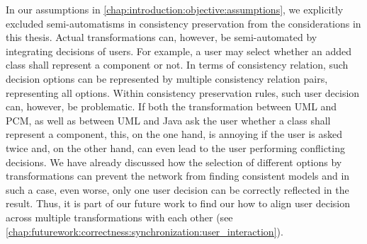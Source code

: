 
In our assumptions in \autoref{chap:introduction:objective:assumptions}, we explicitly excluded semi-automatisms in consistency preservation from the considerations in this thesis.
Actual transformations can, however, be semi-automated by integrating decisions of users.
For example, a user may select whether an added class shall represent a component or not.
In terms of consistency relation, such decision options can be represented by multiple consistency relation pairs, representing all options.
Within consistency preservation rules, such user decision can, however, be problematic.
If both the transformation between \gls{UML} and \gls{PCM}, as well as between \gls{UML} and Java ask the user whether a class shall represent a component, this, on the one hand, is annoying if the user is asked twice and, on the other hand, can even lead to the user performing conflicting decisions.
We have already discussed how the selection of different options by transformations can prevent the network from finding consistent models and in such a case, even worse, only one user decision can be correctly reflected in the result.
Thus, it is part of our future work to find our how to align user decision across multiple transformations with each other (see \autoref{chap:futurework:correctness:synchronization:user_interaction}).

